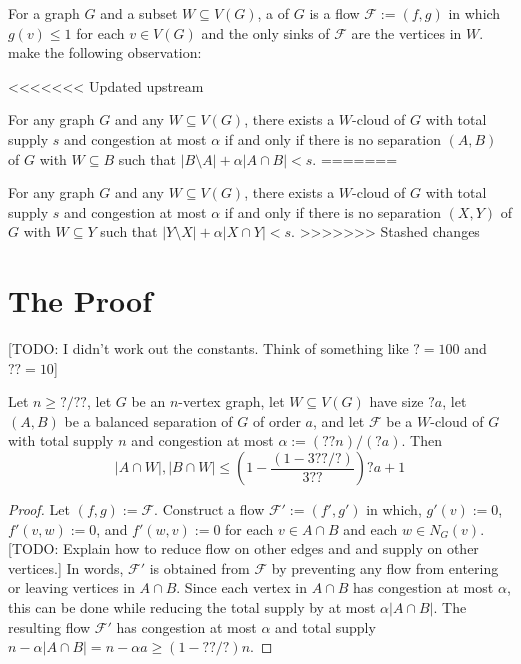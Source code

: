 \documentclass{patmorin}
\begin{document}
For a graph $G$ and a subset $W\subseteq V(G)$, a  of $G$ is a flow $\mathcal{F}:=(f,g)$ in which $g(v)\le 1$ for each $v\in V(G)$ and the only sinks of $\mathcal{F}$ are the vertices in $W$.  \citet{dvorak.norin:treewidth} make the following observation:

<<<<<<< Updated upstream
\begin{obs}\label{w_cloud_menger}
  For any graph $G$ and any $W\subseteq V(G)$, there exists a $W$-cloud of $G$ with total supply $s$ and congestion at most $\alpha$ if and only if there is no separation $(A,B)$ of $G$ with $W\subseteq B$ such that $|B\setminus A| + \alpha|A\cap B| < s$.
=======
\begin{obs}
  For any graph $G$ and any $W\subseteq V(G)$, there exists a $W$-cloud of $G$ with total supply $s$ and congestion at most $\alpha$ if and only if there is no separation $(X,Y)$ of $G$ with $W\subseteq Y$ such that $|Y\setminus X| + \alpha|X\cap Y| < s$.
>>>>>>> Stashed changes
\end{obs}

\section{The Proof}

[TODO: I didn't work out the constants. Think of something like ${?}=100$ and ${??}=10$]

\begin{lem}\label{balanced_on_w}
  Let $n\ge {?}/{??}$, let $G$ be an $n$-vertex graph, let $W\subseteq V(G)$ have size ${?}a$, let $(A,B)$ be a balanced separation of $G$ of order $a$, and let $\mathcal{F}$ be a $W$-cloud of $G$ with total supply $n$ and congestion at most $\alpha:=({??}n)/({?}a)$.  Then
  \[
  |A\cap W|,|B\cap W|\le \left(1-\frac{(1-3{??}/{?})}{3{??}}\right)?a + 1
  \]
\end{lem}

\begin{proof}
  Let $(f,g):=\mathcal{F}$.  Construct a flow $\mathcal{F'}:=(f',g')$ in which,  $g'(v):=0$, $f'(v,w):=0$, and $f'(w,v):=0$ for each $v\in A\cap B$ and each $w\in N_G(v)$.  [TODO: Explain how to reduce flow on other edges and and supply on other vertices.] In words, $\mathcal{F}'$ is obtained from $\mathcal{F}$ by preventing any flow from entering or leaving vertices in $A\cap B$.  Since each vertex in $A\cap B$ has congestion at most $\alpha$, this can be done while reducing the total supply by at most $\alpha|A\cap B|$.  The resulting flow $\mathcal{F}'$ has congestion at most $\alpha$ and total supply $n-\alpha|A\cap B|=n-\alpha a\ge (1-{??/?})n$.


\end{proof}
\end{obs}
\end{document}
